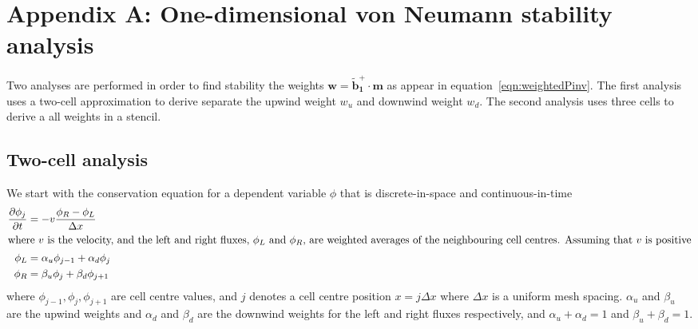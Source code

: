 \section*{Appendix A: One-dimensional von Neumann stability analysis}
Two analyses are performed in order to find stability  the weights $\mathbf{w} = \mathbf{\tilde{b}_1^+} \cdot \mathbf{m}$ as appear in equation~\eqref{eqn:weightedPinv}.  The first analysis uses a two-cell approximation to derive separate  the upwind weight $w_u$ and downwind weight $w_d$.  The second analysis uses three cells to derive a  all weights in a stencil.

\subsection*{Two-cell analysis}
We start with the conservation equation for a dependent variable $\phi$ that is discrete-in-space and continuous-in-time
\begin{align}
\frac{\partial \phi_j}{\partial t} &= - v \frac{\phi_R - \phi_L}{\Delta x} \label{eqn:advectionLR} \\
%
\intertext{where $v$ is the velocity, and the left and right fluxes, $\phi_L$ and $\phi_R$, are weighted averages of the neighbouring cell centres.  Assuming that $v$ is positive}
%
\phi_L &= \alpha_u \phi_{j-1} + \alpha_d \phi_j \\
\phi_R &= \beta_u \phi_j + \beta_d \phi_{j+1}
\end{align}
where $\phi_{j-1}, \phi_j, \phi_{j+1}$ are cell centre values, and $j$ denotes a cell centre position $x = j \Delta x$ where $\Delta x$ is a uniform mesh spacing.
$\alpha_u$ and $\beta_u$ are the upwind weights and $\alpha_d$ and $\beta_d$ are the downwind weights for the left and right fluxes respectively, and $\alpha_u + \alpha_d = 1$ and $\beta_u + \beta_d = 1$.

